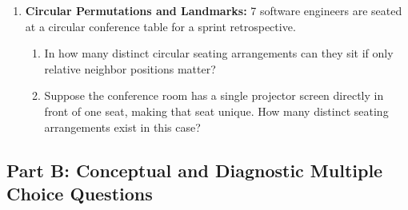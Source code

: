 \begin{enumerate}
    \item \textbf{Circular Permutations and Landmarks:} 7 software engineers are seated at a circular conference table for a sprint retrospective.
    \begin{enumerate}
        \item In how many distinct circular seating arrangements can they sit if only relative neighbor positions matter?
        \item Suppose the conference room has a single projector screen directly in front of one seat, making that seat unique. How many distinct seating arrangements exist in this case?
    \end{enumerate}
\end{enumerate}

\subsection*{Part B: Conceptual and Diagnostic Multiple Choice Questions}

